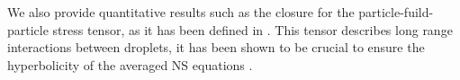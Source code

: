 \documentclass{icnmmf5}
\begin{document}


We also provide quantitative results such as the closure for the particle-fuild-particle stress tensor, as it has been defined in \cite{zhang2021ensemble}. 
This tensor describes long range interactions between droplets, it has been shown to be crucial to ensure the hyperbolicity of the averaged NS equations \cite{fox2020hyperbolic}. %


\end{document}
